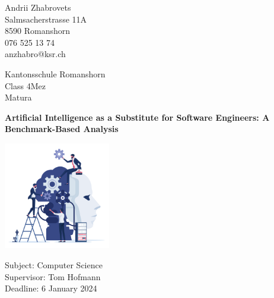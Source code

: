 \begin{titlepage}
    \clearpage\thispagestyle{empty}

    \begin{minipage}[t]{\textwidth}
        \begin{minipage}[t]{0.5\textwidth}
            Andrii Zhabrovets\\
            Salmsacherstrasse 11A\\
            8590 Romanshorn\\
            076 525 13 74\\
            anzhabro@ksr.ch
        \end{minipage}
        \begin{minipage}[t]{0.5\textwidth}
            \begin{flushright}
                Kantonsschule Romanshorn\\
                Class 4Mez\\
                Matura 
            \end{flushright}
        \end{minipage}
    \end{minipage}

    \vspace{4cm}


    {
    \centering

    \Huge\bfseries Artificial Intelligence as a Substitute for Software Engineers: A Benchmark-Based Analysis\par

    \vspace{1cm}

    \includegraphics[width=0.35\textwidth]{attachments/ai-title.png}\par
    }

    \vspace{46mm}

    \noindent
    Subject: Computer Science\noindent \\ 
    Supervisor: Tom Hofmann  \\
    Deadline: 6 January 2024 \\

\end{titlepage}